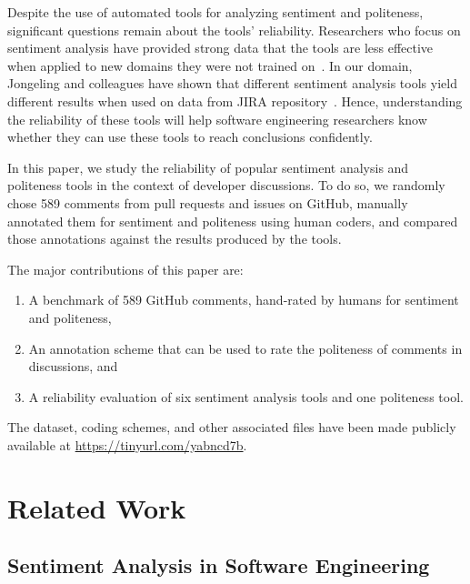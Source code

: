 Despite the use of automated tools for analyzing sentiment and 
politeness, significant questions remain about the tools' reliability.
Researchers who focus on sentiment analysis have provided strong data
that the tools are less effective when applied to new domains they 
were not trained on~\cite{novielli2015challenges,gamon2005pulse}. 
In our domain, Jongeling and colleagues have 
shown that different sentiment analysis tools yield different 
results when used on data from JIRA repository~\cite{jongeling2017negative}. 
Hence, understanding the reliability of these tools will help 
software engineering researchers know whether they can use these
tools to reach conclusions confidently.

In this paper, we study the reliability of popular sentiment analysis 
and politeness tools in the context of developer discussions.
To do so, we randomly chose 589 comments from pull requests and issues on GitHub,
manually annotated them for sentiment and politeness using human coders,
and compared those annotations against the results produced by the tools. 

The major contributions of this paper are:
\begin{enumerate}
    \item A benchmark of 589 GitHub comments, 
    hand-rated by humans for sentiment and politeness, 
    \item An annotation scheme that can be used to rate 
    the politeness of comments in discussions, and
    \item A reliability evaluation of six sentiment analysis 
    tools and one politeness tool.
\end{enumerate}

The dataset, coding schemes, and other associated files have been made publicly available at \href{https://tinyurl.com/yabncd7b}{https://tinyurl.com/yabncd7b}.


\section{Related Work}\label{relwork}
\subsection{Sentiment Analysis in Software Engineering}\label{rwsent}

